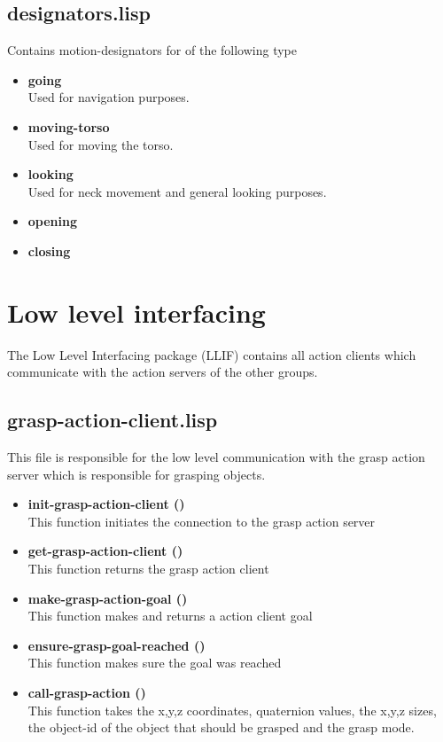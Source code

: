 \documentclass[main.tex]{subfiles}
\begin{document}
	    \subsection{designators.lisp}
	    Contains motion-designators for of the following type
	    \begin{itemize}
		\label{desig}
	    	\item \textbf{going} \\
		Used for navigation purposes.
		\item \textbf{moving-torso} \\
		Used for moving the torso.
		\item \textbf{looking} \\
		Used for neck movement and general looking purposes.
		\item \textbf{opening} \\
		
		\item \textbf{closing} \\
	    \end{itemize}

	  	\section{Low level interfacing}
	  	\label{llif}
		The Low Level Interfacing package (LLIF) contains all action clients which communicate with the action servers of the other groups.
		\subsection{grasp-action-client.lisp}
		This file is responsible for the low level communication with the
		grasp action server which is responsible for grasping objects.
		\begin{itemize}
			\item \textbf{init-grasp-action-client ()} \\
			This function initiates the connection to the grasp action server
			\item \textbf{get-grasp-action-client ()} \\
			This function returns the grasp action client
			\item \textbf{make-grasp-action-goal ()} \\
			This function makes and returns a action client goal
			\item \textbf{ensure-grasp-goal-reached ()} \\
            This function makes sure the goal was reached
			\item \textbf{call-grasp-action ()} \\
			This function takes the x,y,z coordinates, quaternion values, the x,y,z sizes, the object-id of the object that should be grasped and the grasp mode.
		\end{itemize}
\end{document}
